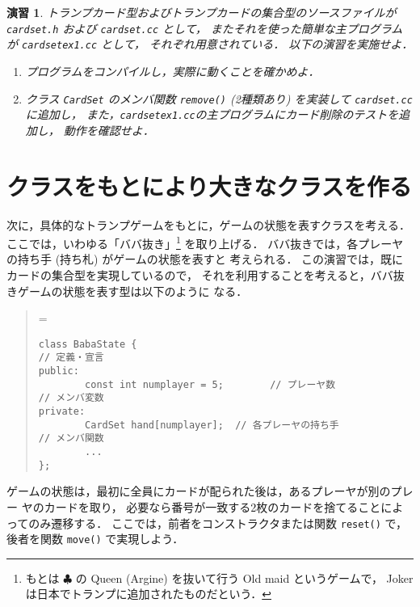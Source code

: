 \documentclass[11pt,a4,epsf]{jarticle}
\def\linesparpage#1{\baselineskip=\textheight\divide\baselineskip#1}
\newtheorem{exerc}{演習}
\begin{document}
\begin{exerc} %
トランプカード型およびトランプカードの集合型のソースファイルが
\verb+cardset.h+ および \verb+cardset.cc+ として，
またそれを使った簡単な主プログラムが \verb+cardsetex1.cc+ として，
それぞれ用意されている．
以下の演習を実施せよ．

\begin{enumerate}

\item[(1)] プログラムをコンパイルし，実際に動くことを確かめよ．

\item[(2)] クラス \verb+CardSet+ のメンバ関数 \verb+remove()+ (2種類あり)
を実装して \verb+cardset.cc+ に追加し，
また，\verb+cardsetex1.cc+の主プログラムにカード削除のテストを追加し，
動作を確認せよ．

\end{enumerate}

\end{exerc} %


\section{クラスをもとにより大きなクラスを作る}

次に，具体的なトランプゲームをもとに，ゲームの状態を表すクラスを考える．
ここでは，いわゆる「ババ抜き」\footnote{もとは $\clubsuit$ の Queen
(Argine) を抜いて行う Old maid というゲームで，
Joker は日本でトランプに追加されたものだという．}
を取り上げる．
ババ抜きでは，各プレーヤの持ち手 (持ち札) がゲームの状態を表すと
考えられる．
この演習では，既にカードの集合型を実現しているので，
それを利用することを考えると，ババ抜きゲームの状態を表す型は以下のように
なる．
\begin{quote}
\linesparpage{50}
\begin{verbatim}
class BabaState {
// 定義・宣言
public:
        const int numplayer = 5;        // プレーヤ数
// メンバ変数
private:
        CardSet hand[numplayer];  // 各プレーヤの持ち手
// メンバ関数
        ...
};
\end{verbatim}
\end{quote}

ゲームの状態は，最初に全員にカードが配られた後は，あるプレーヤが別のプレー
ヤのカードを取り，
必要なら番号が一致する2枚のカードを捨てることによってのみ遷移する．
ここでは，前者をコンストラクタまたは関数 \verb+reset()+ で，
後者を関数 \verb+move()+ で実現しよう．
\end{document}
